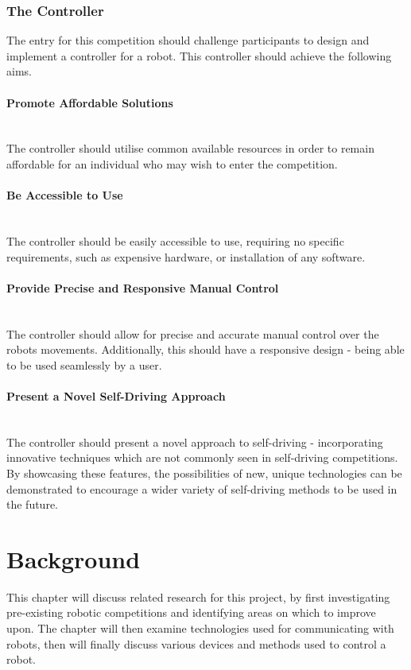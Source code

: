 \documentclass{l4proj}
\begin{document}
\subsection{The Controller}\label{sec:controller-aims}
The entry for this competition should challenge participants to design and implement a controller for a robot. This controller should achieve the following aims.
\\
\subsubsection{Promote Affordable Solutions} \hfill \\
The controller should utilise common available resources in order to remain affordable for an individual who may wish to enter the competition.

\subsubsection{Be Accessible to Use} \hfill \\
The controller should be easily accessible to use, requiring no specific requirements, such as expensive hardware, or installation of any software.

\subsubsection{Provide Precise and Responsive Manual Control} \hfill \\
The controller should allow for precise and accurate manual control over the robots movements. Additionally, this should have a responsive design - being able to be used seamlessly by a user.

\subsubsection{Present a Novel Self-Driving Approach} \hfill \\
The controller should present a novel approach to self-driving - incorporating innovative techniques which are not commonly seen in self-driving competitions. By showcasing these features, the possibilities of new, unique technologies can be demonstrated to encourage a wider variety of self-driving methods to be used in the future.


\chapter{Background}
This chapter will discuss related research for this project, by first investigating pre-existing robotic competitions and identifying areas on which to improve upon. The chapter will then examine technologies used for communicating with robots, then will finally discuss various devices and methods used to control a robot.
\end{document}
